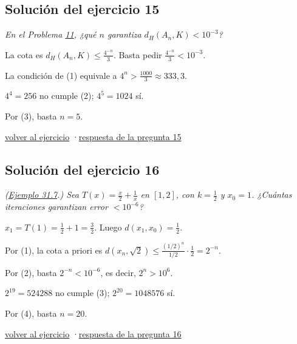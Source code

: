 \documentclass[11pt,a4paper]{article}
\providecommand{\lt}{<}\providecommand{\gt}{>}
\begin{document}
\subsection*{\hypertarget{s-15}{}Solución del ejercicio 15}
\emph{En el Problema \hyperlink{prob-11}{11}, ¿qué $n$ garantiza $d_H(A_n,K)\lt 10^{-3}$?}
\begin{pasos}
\item[(1)] La cota es $d_H(A_n,K)\le\frac{4^{-n}}3$. Basta pedir $\frac{4^{-n}}3\lt 10^{-3}$.
\item[(2)] La condición de (1) equivale a $4^n\gt \frac{1000}3\approx333{,}3$.
\item[(3)] $4^4=256$ no cumple (2); $4^5=1024$ sí.
\item[] Por (3), basta $n=5$.
\end{pasos}
\par{\small \hyperlink{x-15}{volver al ejercicio} \quad·\quad \hyperlink{r-15}{respuesta de la pregunta 15}}
\subsection*{\hypertarget{s-16}{}Solución del ejercicio 16}
\emph{(\href{https://decostruttivismo.github.io/MAT2514-repaso/pdf/MAT2514_apuntes_completos.pdf\#nameddest=teorema.31.7}{Ejemplo 31.7}.) Sea $T(x)=\frac x2+\frac1x$ en $[1,2]$, con $k=\frac12$ y $x_0=1$. ¿Cuántas iteraciones garantizan error $\lt 10^{-6}$?}
\begin{pasos}
\item[(1)] $x_1=T(1)=\frac12+1=\frac32$. Luego $d(x_1,x_0)=\frac12$.
\item[(2)] Por (1), la cota a priori es $d(x_n,\sqrt2)\le\frac{(1/2)^n}{1/2}\cdot\frac12=2^{-n}$.
\item[(3)] Por (2), basta $2^{-n}\lt 10^{-6}$, es decir, $2^n\gt 10^6$.
\item[(4)] $2^{19}=524288$ no cumple (3); $2^{20}=1048576$ sí.
\item[] Por (4), basta $n=20$.
\end{pasos}
\par{\small \hyperlink{x-16}{volver al ejercicio} \quad·\quad \hyperlink{r-16}{respuesta de la pregunta 16}}
\end{document}
